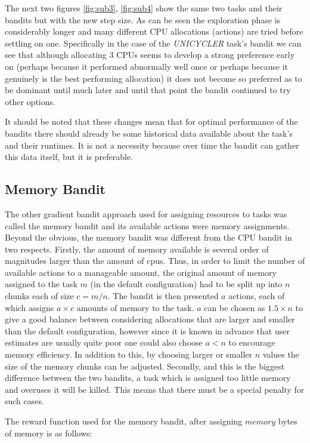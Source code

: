 The next two figures \ref{fig:sub3}, \ref{fig:sub4} show the same two tasks and their bandits but with the new step size. As can be seen the exploration phase is considerably longer and many different CPU allocations (actions) are tried before settling on one. Specifically in the case of the \textit{UNICYCLER} task’s bandit we can see that although allocating 3 CPUs seems to develop a strong preference early on (perhaps because it performed abnormally well once or perhaps because it genuinely is the best performing allocation) it does not become so preferred as to be dominant until much later and until that point the bandit continued to try other options.

It should be noted that these changes mean that for optimal performance of the bandits there should already be some historical data available about the task’s and their runtimes. It is not a necessity because over time the bandit can gather this data itself, but it is preferable.

\subsection{Memory Bandit}
\label{sub:mem_bandit}
The other gradient bandit approach used for assigning resources to tasks was called the memory bandit and its available actions were memory assignments. Beyond the obvious, the memory bandit was different from the CPU bandit in two respects. Firstly, the amount of memory available is several order of magnitudes larger than the amount of cpus. Thus, in order to limit the number of available actions to a manageable amount, the original amount of memory assigned to the task $m$ (in the default configuration) had to be split up into $n$ chunks each of size $c=m/n$. The bandit is then presented $a$ actions, each of which assigns $a\times c$ amounts of memory to the task. $a$ can be chosen as $1.5 \times n$ to give a good balance between considering allocations that are larger and smaller than the default configuration, however since it is known in advance that user estimates are usually quite poor one could also choose $a < n$ to encourage memory efficiency. In addition to this, by choosing larger or smaller $n$ values the size of the memory chunks can be adjusted. Secondly, and this is the biggest difference between the two bandits, a task which is assigned too little memory and overuses it will be killed. This means that there must be a special penalty for such cases.

The reward function used for the memory bandit, after assigning $memory$ bytes of memory is as follows:

